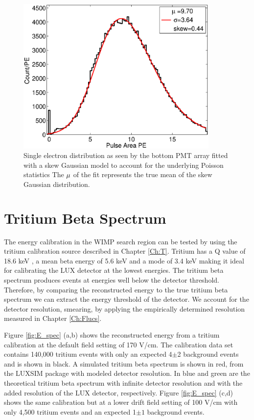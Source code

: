 \begin{figure}[h!]\centering
\includegraphics[width=100mm]{Chapter_E_Scale/Figures/bottom_SE.eps}
\caption{Single electron distribution as seen by the bottom PMT array fitted with a skew Gaussian model to account for the underlying Poisson statistics The $\rm \mu$ of the fit represents the true mean of the skew Gaussian distribution. }
\label{fig:SingleE}
\end{figure}

\newpage

\section{Tritium Beta Spectrum}

The energy calibration in the WIMP search region can be tested by using the tritium calibration source described in Chapter \ref{Ch:T}. Tritium has a Q value of 18.6 keV \cite{Tritium_Q}, a mean beta energy of 5.6 keV \cite{Tritium_Mean} and a mode of 3.4 keV \cite{Tritium_Eq} making it ideal for calibrating the LUX detector at the lowest energies. The tritium beta spectrum produces events at energies well below the detector threshold. Therefore, by comparing the reconstructed energy to the true tritium beta spectrum we can extract the energy threshold of the detector. We account for the detector resolution, smearing, by applying the empirically determined resolution measured in Chapter \ref{Ch:Flucs}. 

Figure \ref{fig:E_spec} (a,b) shows the reconstructed energy from a tritium calibration at the default field setting of 170 V/cm. The calibration data set contains 140,000 tritium events with only an expected 4$\pm$2 background events and is shown in black. A simulated tritium beta spectrum is shown in red, from the LUXSIM package with modeled detector resolution.  In blue and green are the theoretical tritium beta spectrum with infinite detector resolution and with the added resolution of the LUX detector, respectively.  Figure \ref{fig:E_spec} (c,d) shows the same calibration but at a lower drift field setting of 100 V/cm with only 4,500 tritium events and an expected 1$\pm 1$ background events.

